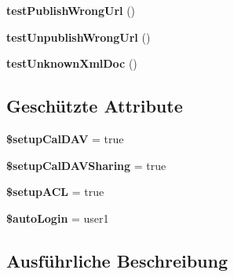 \begin{DoxyCompactItemize}
\item 
\mbox{\label{class_sabre_1_1_cal_d_a_v_1_1_sharing_plugin_test_a0d7da33b830da2af540f5c08247f234c}} 
{\bfseries test\+Publish\+Wrong\+Url} ()
\item 
\mbox{\label{class_sabre_1_1_cal_d_a_v_1_1_sharing_plugin_test_a47c8210b3c507e557366c198f829bb47}} 
{\bfseries test\+Unpublish\+Wrong\+Url} ()
\item 
\mbox{\label{class_sabre_1_1_cal_d_a_v_1_1_sharing_plugin_test_ae5b6c117701d9e5bae6725091387dd1d}} 
{\bfseries test\+Unknown\+Xml\+Doc} ()
\end{DoxyCompactItemize}
\subsection*{Geschützte Attribute}
\begin{DoxyCompactItemize}
\item 
\mbox{\label{class_sabre_1_1_cal_d_a_v_1_1_sharing_plugin_test_a1a378e934a6da82835c74d79785c2e37}} 
{\bfseries \$setup\+Cal\+D\+AV} = true
\item 
\mbox{\label{class_sabre_1_1_cal_d_a_v_1_1_sharing_plugin_test_a2062bcb368aac12414e0f3637b8e2891}} 
{\bfseries \$setup\+Cal\+D\+A\+V\+Sharing} = true
\item 
\mbox{\label{class_sabre_1_1_cal_d_a_v_1_1_sharing_plugin_test_a8141f22a662d32cacf25845b3287fb2e}} 
{\bfseries \$setup\+A\+CL} = true
\item 
\mbox{\label{class_sabre_1_1_cal_d_a_v_1_1_sharing_plugin_test_acbe4e47d2d5564c761fd689be0722dda}} 
{\bfseries \$auto\+Login} = \textquotesingle{}user1\textquotesingle{}
\end{DoxyCompactItemize}


\subsection{Ausführliche Beschreibung}


